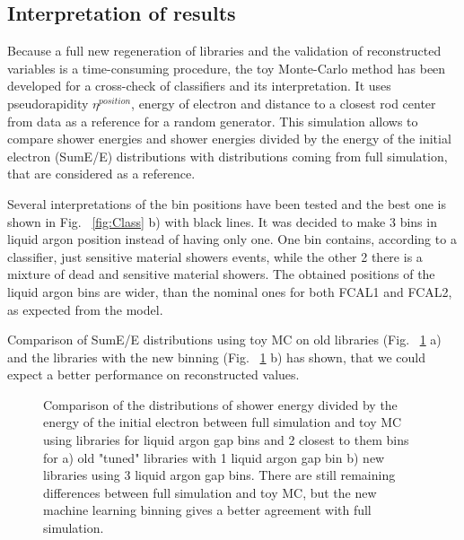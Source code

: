 {\subsection{Interpretation of results}

Because a full new regeneration of libraries and the validation of reconstructed variables is a time-consuming procedure, the toy Monte-Carlo method has been developed for a cross-check of classifiers and its interpretation. It uses pseudorapidity $\eta^{position}$, energy of electron and distance to a closest rod center from data as a reference for a random generator. This simulation allows to compare shower energies and shower energies divided by  the energy of the initial electron (SumE/E) distributions with distributions coming from full simulation, that are considered as a reference.

Several interpretations of the bin positions have been tested and the best one is shown in Fig. ~\ref{fig:Class} b) with black lines. It was decided to make 3 bins in liquid argon position instead of having only one. One bin contains, according to a classifier, just sensitive material showers events, while the other 2 there is a mixture of dead and sensitive material showers. The obtained positions of the liquid argon bins are wider, than the nominal ones for both FCAL1 and FCAL2, as expected from the model.

Comparison of SumE/E distributions using toy MC on old libraries (Fig. ~\ref{fig:Interpret} a) and the libraries with the new binning (Fig. ~\ref{fig:Interpret} b) has shown, that we could expect a better performance on reconstructed values.

\begin{figure}[!tbp]
\begin{minipage}[h]{0.49\linewidth}
\end{minipage}
\hfill
\begin{minipage}[h]{0.49\linewidth}
\end{minipage}
\caption{Comparison of the distributions of shower energy divided by  the energy of the initial electron between full simulation and toy MC using libraries for liquid argon gap bins and 2 closest to them bins for a) old "tuned" libraries with 1 liquid argon gap bin  b) new libraries using 3 liquid argon gap bins. There are still remaining differences between full simulation and toy MC, but the new machine learning binning gives a better agreement with full simulation.}
\label{fig:Interpret}
\end{figure}


}
